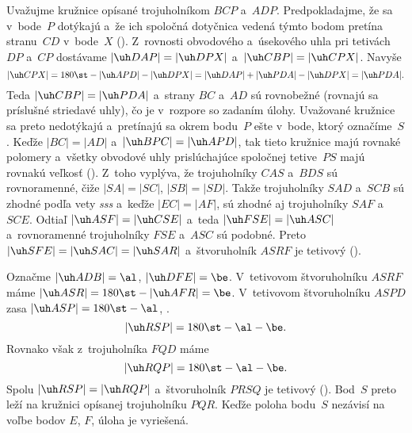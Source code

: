 {%
Uvažujme kružnice opísané trojuholníkom $BCP$ a~$ADP$.
%
Predpokladajme, že sa v~bode~$P$ dotýkajú a~že ich spoločná dotyčnica vedená týmto bodom pretína stranu~$CD$ v~bode~$X$ (\obr). Z~rovnosti obvodového a~úsekového uhla pri tetivách $DP$ a~$CP$ dostávame $|\uh DAP|=|\uh DPX|$ a~$|\uh CBP|=|\uh CPX|$. Navyše
$$
|\uh CPX|=180\st-|\uh APD|-|\uh DPX|=|\uh DAP|+|\uh PDA|-|\uh DPX|=|\uh PDA|.
$$
Teda $|\uh CBP|=|\uh PDA|$ a~strany $BC$ a~$AD$ sú rovnobežné (rovnajú sa príslušné striedavé uhly), čo je v~rozpore so zadaním úlohy. Uvažované kružnice sa preto nedotýkajú a~pretínajú sa okrem bodu~$P$ ešte v~bode, ktorý označíme~$S$. Keďže $|BC|=|AD|$ a~$|\uh BPC|=|\uh APD|$, tak tieto kružnice majú rovnaké polomery a~všetky obvodové uhly prislúchajúce spoločnej tetive~$PS$ majú rovnakú veľkosť (\obr).
Z~toho vyplýva, že trojuholníky $CAS$ a~$BDS$ sú rovnoramenné, čiže $|SA|=|SC|$, $|SB|=|SD|$. Takže trojuholníky $SAD$ a~$SCB$ sú zhodné podľa vety {\it sss} a~keďže $|EC|=|AF|$, sú zhodné aj trojuholníky $SAF$ a~$SCE$. Odtiaľ $|\uh ASF|=|\uh CSE|$ a~teda $|\uh FSE|=|\uh ASC|$ a~rovnoramenné trojuholníky $FSE$ a~$ASC$ sú podobné. Preto $|\uh SFE|=|\uh SAC|=|\uh SAR|$ a~štvoruholník $ASRF$ je tetivový (\obr).

Označme $|\uh ADB|=\al$, $|\uh DFE|=\be$. V~tetivovom štvoruholníku $ASRF$ máme $|\uh ASR|=180\st-|\uh AFR|=\be$. V~tetivovom štvoruholníku $ASPD$ zasa $|\uh ASP|=180\st-\al$, \tj.
$$
|\uh RSP|=180\st-\al-\be.
$$
Rovnako však z~trojuholníka $FQD$ máme
$$
|\uh RQP|=180\st-\al-\be.
$$
Spolu $|\uh RSP|=|\uh RQP|$ a~štvoruholník $PRSQ$ je tetivový (\obr). Bod~$S$ preto leží na kružnici opísanej trojuholníku $PQR$. Keďže poloha bodu~$S$ nezávisí na voľbe bodov $E$, $F$, úloha je vyriešená.
%
}

